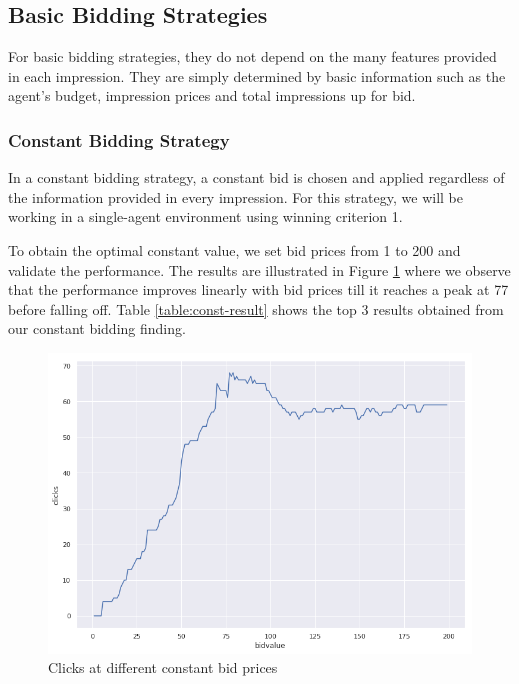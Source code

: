 \documentclass{sig-alternate-05-2015}
\begin{document}
\subsection{Basic Bidding Strategies}
For basic bidding strategies, they do not depend on the many features provided in each impression. They are simply determined by basic information such as the agent's budget, impression prices and total impressions up for bid.

\subsubsection{Constant Bidding Strategy}
In a constant bidding strategy, a constant bid is chosen and applied regardless of the information provided in every impression. For this strategy, we will be working in a single-agent environment using winning criterion 1. 

To obtain the optimal constant value, we set bid prices from 1 to 200 and validate the performance. The results are illustrated in Figure \ref{fig:const-clicks} where we observe that the performance improves linearly with bid prices till it reaches a peak at 77 before falling off. Table \ref{table:const-result} shows the top 3 results obtained from our constant bidding finding.

\begin{figure}[h!]
    \centering
    \includegraphics[width=\linewidth]{images/const_bid.png}
    \caption{Clicks at different constant bid prices}
    \label{fig:const-clicks}
\end{figure}
\end{document}
